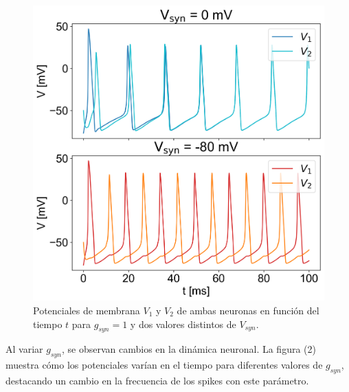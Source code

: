 \documentclass[aps,prb,twocolumn,superscriptaddress,floatfix,longbibliography]{revtex4-2}
\newcounter{para}
\begin{document}
\begin{figure}[h]
    \includegraphics[clip=true,width=\columnwidth]{ej1_potenciales_vs_Vsyn.png}
    \caption{Potenciales de membrana $V_1$ y $V_2$ de ambas neuronas en función del tiempo $t$ para $g_{syn} = 1$ y dos valores distintos de $V_{syn}$.}
    \label{fig:ej1_potenciales_vs_Vsyn}
\end{figure}

Al variar \(g_{syn}\), se observan cambios en la dinámica neuronal. La figura (2) muestra cómo los potenciales varían en el tiempo para diferentes valores de \(g_{syn}\), destacando un cambio en la frecuencia de los spikes con este parámetro.
\end{document}
